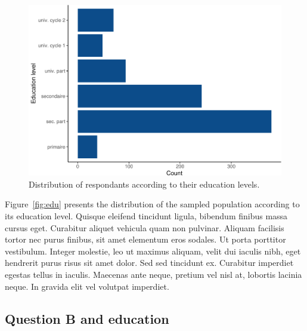 \documentclass[utf8]{frontiersSCNS}
\begin{document}
\begin{figure}
\includegraphics[width=1\linewidth]{perception_of_science_files/figure-latex/fig_edu-1} \caption{Distribution of respondants according to their education levels\label{fig:edu}.}\label{fig:fig_edu}
\end{figure}

Figure~\ref{fig:edu} presents the distribution of the sampled population
according to its education level. Quisque eleifend tincidunt ligula,
bibendum finibus massa cursus eget. Curabitur aliquet vehicula quam non
pulvinar. Aliquam facilisis tortor nec purus finibus, sit amet elementum
eros sodales. Ut porta porttitor vestibulum. Integer molestie, leo ut
maximus aliquam, velit dui iaculis nibh, eget hendrerit purus risus sit
amet dolor. Sed sed tincidunt ex. Curabitur imperdiet egestas tellus in
iaculis. Maecenas ante neque, pretium vel nisl at, lobortis lacinia
neque. In gravida elit vel volutpat imperdiet.

\hypertarget{question-b-and-education}{%
\subsection{Question B and education}\label{question-b-and-education}}
\end{document}

